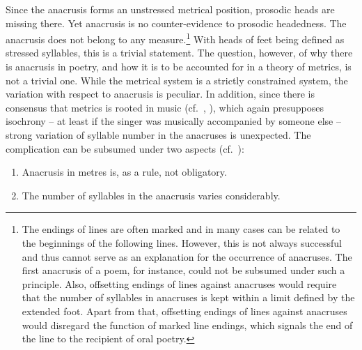 \documentclass[output=paper
  ,nobabel
  ,uniformtopskip %
]{langscibook}
\begin{document}
\noindent
Since the anacrusis forms an unstressed metrical position, prosodic heads are missing there. Yet anacrusis is no counter-evidence to prosodic headedness. The anacrusis does not belong to any measure.\footnote{The endings of lines are often marked and in many cases can be related to the beginnings of the following lines. However, this is not always successful and thus cannot serve as an explanation for the occurrence of anacruses. The first anacrusis of a poem, for instance, could not be subsumed under such a principle. Also, offsetting endings of lines against anacruses would require that the number of syllables in anacruses is kept within a limit defined by the extended foot. Apart from that, offsetting endings of lines against anacruses would disregard the function of marked line endings, which signals the end of the line to the recipient of oral poetry.} With heads of feet being defined as stressed syllables, this is a trivial statement. The question, however, of why there is anacrusis in  poetry, and how it is to be accounted for in a theory of metrics, is not a trivial one. While the  metrical system is a strictly constrained system, the variation with respect to anacrusis is peculiar. In addition, since there is consensus that  metrics is rooted in music (cf.\ \citealt{Hofmann1963}, \citealt{Jammers1964}), which again presupposes isochrony – at least if the singer was musically accompanied by someone else – strong variation of syllable number in the anacruses is unexpected. The complication can be subsumed under two aspects (cf.\ \citealt{NoelAzizHanna2010}):
\begin{enumerate}
    \item  Anacrusis in  metres is, as a rule, not obligatory.

    \item The number of syllables in the anacrusis varies considerably.
\end{enumerate}
\end{document}
